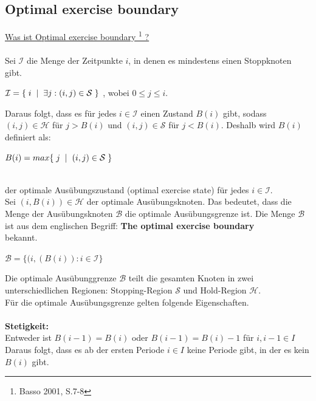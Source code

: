 \documentclass[12pt,a4paper]{article}
\begin{document}
\begin{text}
\section{Optimal exercise boundary}  
\underline{Was ist Optimal exercise boundary \footnote[2]{Basso 2001, S.7-8} ?}\\\\
Sei $\mathcal{I}$ die Menge der Zeitpunkte $i$, in denen es mindestens einen Stoppknoten gibt.
\begin{center}
         $\mathcal{I} = \{ \hspace{0,1 cm} i \hspace{0,2 cm} \vert \hspace{0,2 cm} \exists j :  (i,j) \in \mathcal{S} \hspace{0,1 cm}\} $ , wobei $0 \leqslant j \leqslant i. $
\end{center}
Daraus folgt, dass es für jedes $ i \in \mathcal{I} $ einen Zustand $B(i)$ gibt, sodass $(i,j) \in \mathcal{H}$ \hspace{0,2 cm} für  $j > B(i)$ und $(i,j) \in \mathcal{S}$ für  $j < B(i).$ Deshalb wird $B(i)$ definiert als:
\begin{center}
    $B(i) = max \{ \hspace{0,1 cm} j \hspace{0,2 cm} \vert \hspace{0,2 cm} (i,j) \in \mathcal{S} \hspace{0,1 cm}\} $ 
\end{center}
\\
der optimale Ausübungszustand (optimal exercise state) für jedes $ i \in \mathcal{I} $. \\
Sei $(i,B(i)) \in \mathcal{H} $ der optimale Ausübungsknoten. Das bedeutet, dass die Menge der Ausübungsknoten $\mathcal{B}$ die optimale Ausübungsgrenze ist. Die Menge $\mathcal{B}$ ist aus dem englischen Begriff: \textbf{The optimal exercise boundary}\\ bekannt.
\begin{center}
    $ \mathcal{B} = \{ (i,(B(i)) : i \in \mathcal{I} \}$
\end{center}
Die optimale Ausübunggrenze $\mathcal{B}$ teilt die gesamten Knoten in zwei unterschiedlichen Regionen: Stopping-Region $\mathcal{S}$ und Hold-Region
$\mathcal{H}$. 
\\
Für die optimale Ausübungsgrenze gelten folgende Eigenschaften.
\\\\
\textbf{Stetigkeit:}
\\
Entweder ist $B(i-1) = B(i)$ oder $B(i-1) = B(i) - 1$ für $i, i-1 \in I$
\\
Daraus folgt, dass es ab der ersten Periode $i \in I$ keine Periode gibt, in der es kein $B(i)$ gibt.


\end{text}
\end{document}
